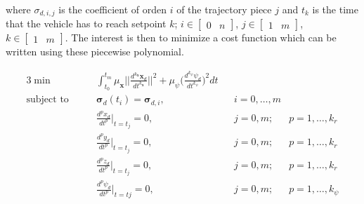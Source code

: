 \noindent where $\sigma_{d,i,j}$ is the coefficient of orden $i$ of the trajectory piece $j$ and $t_k$ is the time that the vehicle has to reach setpoint $k$; $i \in \begin{bmatrix}0 & n\end{bmatrix}$, $j \in \begin{bmatrix}1 & m\end{bmatrix}$, $k \in \begin{bmatrix}1 & m\end{bmatrix}$. The interest is then to minimize a cost function which can be written using these piecewise polynomial.

\begin{alignat}{3}
	\min\qquad & \int_{t_0}^{t_m}\mu_{\mathbf{x}} \Bigg|\Bigg|\frac{d^{k_{\mathbf{x}}}\mathbf{x}_d}{dt^{k_{\mathbf{x}}}} \Bigg|\Bigg|^2 + \mu_{\psi}\Bigg(\frac{d^{k_{\psi}}\psi_d}{dt^{k_{\psi}}}\Bigg)^2dt \\
	\text{subject to}\qquad & \boldsymbol{\sigma}_d(t_i) = \boldsymbol{\sigma}_{d,i}, && i=0,\dots ,m \nonumber \\
	& \frac{d^px_d}{dt^p}\Big|_{t=t_j}=0, && j=0,m; & p=1,\dots ,k_r \nonumber \\
	& \frac{d^py_d}{dt^p}\Big|_{t=t_j}=0, && j=0,m; & p=1,\dots ,k_r \nonumber \\
	& \frac{d^pz_d}{dt^p}\Big|_{t=t_j}=0, && j=0,m; & p=1,\dots ,k_r \nonumber \\
	& \frac{d^p\psi_d}{dt^p}\Big|_{t=tj}=0, && j=0,m; & p=1,\dots ,k_{\psi} \nonumber
	\label{eq:minimizationCost}
\end{alignat}

